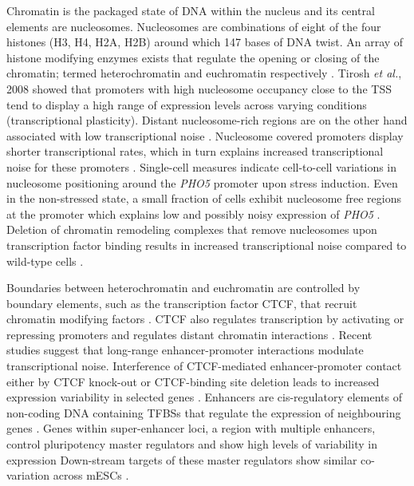 Chromatin is the packaged state of DNA within the nucleus and its central elements are nucleosomes. Nucleosomes are combinations of eight of the four histones (H3, H4, H2A, H2B) around which 147 bases of DNA twist. An array of histone modifying enzymes exists that regulate the opening or closing of the chromatin; termed heterochromatin and euchromatin respectively \citep{Kouzarides2007}. Tirosh \textit{et al.}, 2008 showed that promoters with high nucleosome occupancy close to the TSS tend to display a high range of expression levels across varying conditions (transcriptional plasticity). Distant nucleosome-rich regions are on the other hand associated with low transcriptional noise \citep{Tirosh2008}. Nucleosome covered promoters display shorter transcriptional rates, which in turn explains increased transcriptional noise for these promoters \cite{Dey2015}. Single-cell measures indicate cell-to-cell variations in nucleosome positioning around the \textit{PHO5} promoter upon stress induction. Even in the non-stressed state, a small fraction of cells exhibit nucleosome free regions at the promoter which explains low and possibly noisy expression of \textit{PHO5} \citep{Small2014}. Deletion of chromatin remodeling complexes that remove nucleosomes upon transcription factor binding results in increased transcriptional noise compared to wild-type cells \citep{Raser2004}. 

\newpage

Boundaries between heterochromatin and euchromatin are controlled by boundary elements, such as the transcription factor \Gls{CTCF}, that recruit chromatin modifying factors \citep{Kouzarides2007}. CTCF also regulates transcription by activating or repressing promoters and regulates distant chromatin interactions \citep{Kim2015a}. Recent studies suggest that long-range enhancer-promoter interactions modulate transcriptional noise. Interference of CTCF-mediated enhancer-promoter contact either by CTCF knock-out or CTCF-binding site deletion leads to increased expression variability in selected genes \citep{Ren2017}. Enhancers are cis-regulatory elements of non-coding DNA containing TFBSs that regulate the expression of neighbouring genes \citep{Blackwood1998}. Genes within super-enhancer loci, a region with multiple enhancers, control pluripotency master regulators and show high levels of variability in expression Down-stream targets of these master regulators show similar co-variation across mESCs \citep{Faure2017}.

